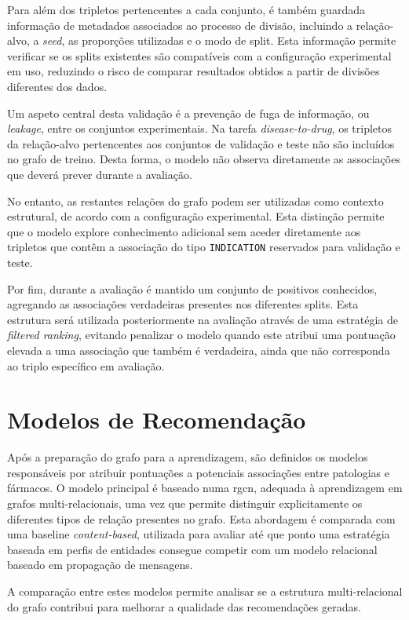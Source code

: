 Para além dos tripletos pertencentes a cada conjunto, é também guardada informação de metadados associados ao processo de divisão, incluindo a relação-alvo, a \emph{seed}, as proporções utilizadas e o modo de split. Esta informação permite verificar se os splits existentes são compatíveis com a configuração experimental em uso, reduzindo o risco de comparar resultados obtidos a partir de divisões diferentes dos dados.

Um aspeto central desta validação é a prevenção de fuga de informação, ou \emph{leakage}, entre os conjuntos experimentais. Na tarefa \emph{disease-to-drug}, os tripletos da relação-alvo pertencentes aos conjuntos de validação e teste não são incluídos no grafo de treino. Desta forma, o modelo não observa diretamente as associações que deverá prever durante a avaliação.

No entanto, as restantes relações do grafo podem ser utilizadas como contexto estrutural, de acordo com a configuração experimental. Esta distinção permite que o modelo explore conhecimento adicional sem aceder diretamente aos tripletos que contêm a associação do tipo \texttt{INDICATION} reservados para validação e teste.

Por fim, durante a avaliação é mantido um conjunto de positivos conhecidos, agregando as associações verdadeiras presentes nos diferentes splits. Esta estrutura será utilizada posteriormente na avaliação através de uma estratégia de \emph{filtered ranking}, evitando penalizar o modelo quando este atribui uma pontuação elevada a uma associação que também é verdadeira, ainda que não corresponda ao triplo específico em avaliação.


\section{Modelos de Recomendação}
\label{sec:modelos-recomendacao}
Após a preparação do grafo para a aprendizagem, são definidos os modelos responsáveis por atribuir pontuações a potenciais associações entre patologias e fármacos. O modelo principal é baseado numa \acrshort{rgcn}, adequada à aprendizagem em grafos multi-relacionais, uma vez que permite distinguir explicitamente os diferentes tipos de relação presentes no grafo. Esta abordagem é comparada com uma baseline \emph{content-based}, utilizada para avaliar até que ponto uma estratégia baseada em perfis de entidades consegue competir com um modelo relacional baseado em propagação de mensagens.

A comparação entre estes modelos permite analisar se a estrutura multi-relacional do grafo contribui para melhorar a qualidade das recomendações geradas.

